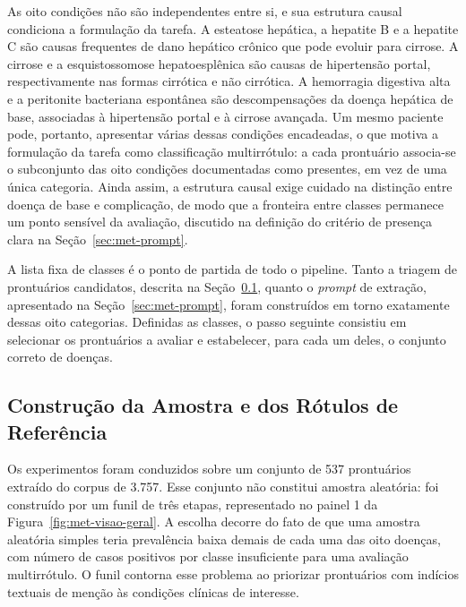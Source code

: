\label{sec:estrutura-causal}As oito condições não são independentes entre si, e sua estrutura causal condiciona a formulação da tarefa. A esteatose hepática, a hepatite B e a hepatite C são causas frequentes de dano hepático crônico que pode evoluir para cirrose. A cirrose e a esquistossomose hepatoesplênica são causas de hipertensão portal, respectivamente nas formas cirrótica e não cirrótica. A hemorragia digestiva alta e a peritonite bacteriana espontânea são descompensações da doença hepática de base, associadas à hipertensão portal e à cirrose avançada. Um mesmo paciente pode, portanto, apresentar várias dessas condições encadeadas, o que motiva a formulação da tarefa como classificação multirrótulo: a cada prontuário associa-se o subconjunto das oito condições documentadas como presentes, em vez de uma única categoria. Ainda assim, a estrutura causal exige cuidado na distinção entre doença de base e complicação, de modo que a fronteira entre classes permanece um ponto sensível da avaliação, discutido na definição do critério de presença clara na Seção~\ref{sec:met-prompt}.

A lista fixa de classes é o ponto de partida de todo o pipeline. Tanto a triagem de prontuários candidatos, descrita na Seção~\ref{sec:met-amostra}, quanto o \textit{prompt} de extração, apresentado na Seção~\ref{sec:met-prompt}, foram construídos em torno exatamente dessas oito categorias. Definidas as classes, o passo seguinte consistiu em selecionar os prontuários a avaliar e estabelecer, para cada um deles, o conjunto correto de doenças.

\subsection{Construção da Amostra e dos Rótulos de Referência}\label{sec:met-amostra}

Os experimentos foram conduzidos sobre um conjunto de 537 prontuários extraído do corpus de 3.757. Esse conjunto não constitui amostra aleatória: foi construído por um funil de três etapas, representado no painel 1 da Figura~\ref{fig:met-visao-geral}. A escolha decorre do fato de que uma amostra aleatória simples teria prevalência baixa demais de cada uma das oito doenças, com número de casos positivos por classe insuficiente para uma avaliação multirrótulo. O funil contorna esse problema ao priorizar prontuários com indícios textuais de menção às condições clínicas de interesse.

